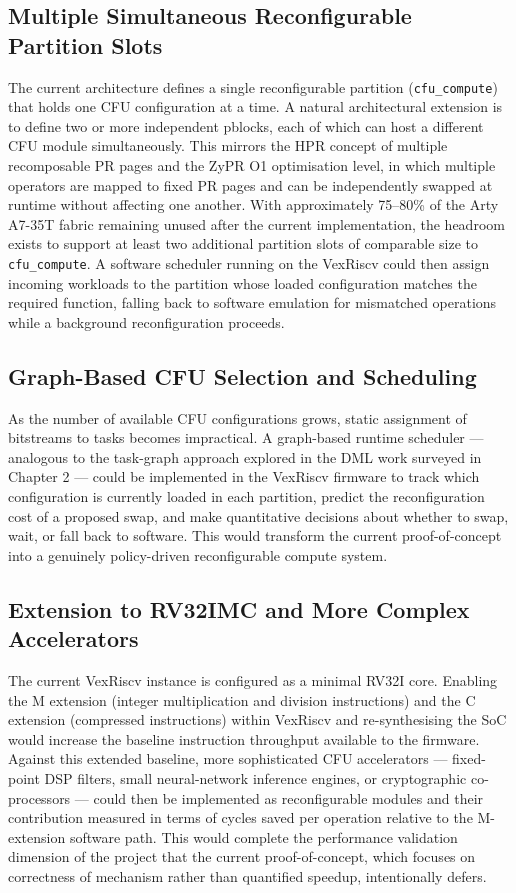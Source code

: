 \subsection{Multiple Simultaneous Reconfigurable Partition Slots}

The current architecture defines a single reconfigurable partition (\texttt{cfu\_compute}) that holds one CFU configuration at a time. A natural architectural extension is to define two or more independent pblocks, each of which can host a different CFU module simultaneously. This mirrors the HPR concept of multiple recomposable PR pages and the ZyPR O1 optimisation level, in which multiple operators are mapped to fixed PR pages and can be independently swapped at runtime without affecting one another. With approximately 75–80\% of the Arty A7-35T fabric remaining unused after the current implementation, the headroom exists to support at least two additional partition slots of comparable size to \texttt{cfu\_compute}. A software scheduler running on the VexRiscv could then assign incoming workloads to the partition whose loaded configuration matches the required function, falling back to software emulation for mismatched operations while a background reconfiguration proceeds.

\subsection{Graph-Based CFU Selection and Scheduling}

As the number of available CFU configurations grows, static assignment of bitstreams to tasks becomes impractical. A graph-based runtime scheduler — analogous to the task-graph approach explored in the DML work surveyed in Chapter 2 — could be implemented in the VexRiscv firmware to track which configuration is currently loaded in each partition, predict the reconfiguration cost of a proposed swap, and make quantitative decisions about whether to swap, wait, or fall back to software. This would transform the current proof-of-concept into a genuinely policy-driven reconfigurable compute system.

\subsection{Extension to RV32IMC and More Complex Accelerators}

The current VexRiscv instance is configured as a minimal RV32I core. Enabling the M extension (integer multiplication and division instructions) and the C extension (compressed instructions) within VexRiscv and re-synthesising the SoC would increase the baseline instruction throughput available to the firmware. Against this extended baseline, more sophisticated CFU accelerators — fixed-point DSP filters, small neural-network inference engines, or cryptographic co-processors — could then be implemented as reconfigurable modules and their contribution measured in terms of cycles saved per operation relative to the M-extension software path. This would complete the performance validation dimension of the project that the current proof-of-concept, which focuses on correctness of mechanism rather than quantified speedup, intentionally defers.

